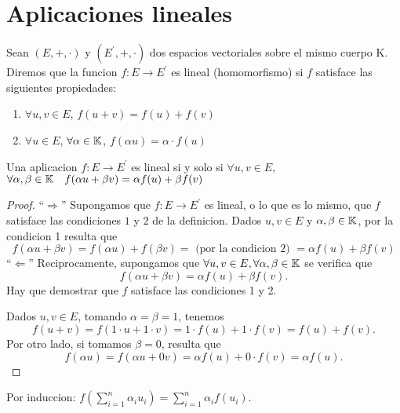\part{Aplicaciones lineales}

\begin{definition}
	Sean \((E, +, \cdot)\) y \((E^\prime, +, \cdot )\) dos espacios vectoriales sobre el mismo cuerpo K. Diremos que la funcion \(f: E \to E^\prime \) es lineal (homomorfismo) si \(f \) satisface las siguientes propiedades:
	\begin{enumerate}
		\item \(\forall u,v \in E \), \(f(u+v) = f(u) + f(v )\)
		\item \(\forall u \in E \), \(\forall \alpha \in \mathbb{K} \), \(f(\alpha u) = \alpha \cdot f(u )\)
	\end{enumerate}
\end{definition}
\begin{proposition}
	Una aplicacion \(f: E \to E^\prime \) es lineal si y solo si \(\forall u,v \in E \), \(\forall  \alpha, \beta \in \mathbb{K} \quad f(\alpha u + \beta v) = \alpha f(u) + \beta f(v )\)
\end{proposition}
\begin{proof}
	``\(\Rightarrow \)'' Supongamos que \(f\colon E \to E^\prime  \) es lineal, o lo que es lo mismo, que \(f \) satisface las condiciones \(1 \) y \(2 \) de la definicion. Dados \(u,v \in E \) y \(\alpha,\beta \in \mathbb{K} \), por la condicion 1 resulta que
	\[
		f(\alpha u + \beta v) = f(\alpha u) + f(\beta v) = \text{ (por la condicion 2) } = \alpha f(u) + \beta f(v )
	\]
	``\(\Leftarrow \)'' Reciprocamente, supongamos que \(\forall u,v \in E, \forall \alpha,\beta \in \mathbb{K} \) se verifica que
	\[
		f(\alpha u + \beta v) = \alpha f(u) + \beta f(v ).
	\]
	Hay que demostrar que \(f \) satisface las condiciones 1 y 2.

	Dados \(u,v \in E \), tomando \(\alpha = \beta = 1 \), tenemos
	\[
		f(u + v) = f(1 \cdot u + 1 \cdot v) = 1 \cdot f(u) + 1 \cdot f(v) = f(u) + f(v).
	\]
	Por otro lado, si tomamos \(\beta = 0 \), resulta que
	\[
		f(\alpha u) = f(\alpha u + 0v) = \alpha f(u) + 0 \cdot f(v) = \alpha f(u).
	\]
\end{proof}
Por induccion: \(f(\sum_{i=1}^{n } \alpha_i u_i) = \sum_{i=1}^{n } \alpha_i f(u_i)\).

